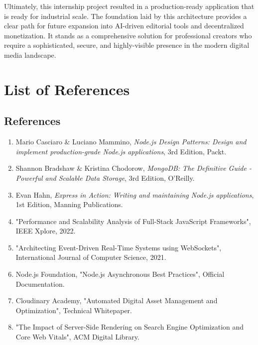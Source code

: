 \documentclass[12pt,a4paper]{report}
\begin{document}
Ultimately, this internship project resulted in a production-ready application that is ready for industrial scale. The foundation laid by this architecture provides a clear path for future expansion into AI-driven editorial tools and decentralized monetization. It stands as a comprehensive solution for professional creators who require a sophisticated, secure, and highly-visible presence in the modern digital media landscape.

\newpage

\chapter{List of References}
\section{References}

\begin{enumerate}
    \item Mario Casciaro \& Luciano Mammino, \textit{Node.js Design Patterns: Design and implement production-grade Node.js applications}, 3rd Edition, Packt.
    
    \item Shannon Bradshaw \& Kristina Chodorow, \textit{MongoDB: The Definitive Guide - Powerful and Scalable Data Storage}, 3rd Edition, O'Reilly.
    
    \item Evan Hahn, \textit{Express in Action: Writing and maintaining Node.js applications}, 1st Edition, Manning Publications.
    
    \item "Performance and Scalability Analysis of Full-Stack JavaScript Frameworks", IEEE Xplore, 2022.
    
    \item "Architecting Event-Driven Real-Time Systems using WebSockets", International Journal of Computer Science, 2021.
    
    \item Node.js Foundation, "Node.js Asynchronous Best Practices", Official Documentation.
    
    \item Cloudinary Academy, "Automated Digital Asset Management and Optimization", Technical Whitepaper.
    
    \item "The Impact of Server-Side Rendering on Search Engine Optimization and Core Web Vitals", ACM Digital Library.
\end{enumerate}
\end{document}

